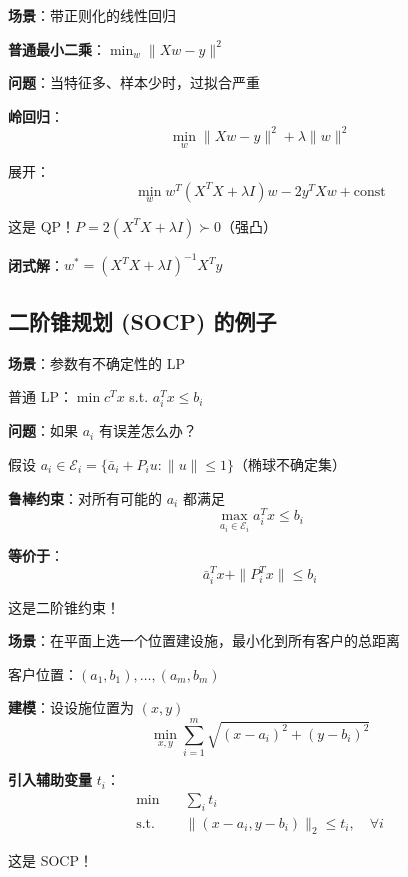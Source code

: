 \documentclass[12pt, a4paper]{ctexart}
\begin{document}
\begin{blackboard}[QP 例子 3：岭回归]

\textbf{场景}：带正则化的线性回归

\textbf{普通最小二乘}：$\min_w \|Xw - y\|^2$

\textbf{问题}：当特征多、样本少时，过拟合严重

\textbf{岭回归}：
\[
\min_w \|Xw - y\|^2 + \lambda \|w\|^2
\]

展开：
\[
\min_w w^T (X^T X + \lambda I) w - 2 y^T X w + \text{const}
\]

这是 QP！$P = 2(X^T X + \lambda I) \succ 0$（强凸）

\textbf{闭式解}：$w^* = (X^T X + \lambda I)^{-1} X^T y$

\end{blackboard}

\subsection{二阶锥规划 (SOCP) 的例子}

\begin{blackboard}

\textbf{场景}：参数有不确定性的 LP

普通 LP：$\min c^T x$ s.t. $a_i^T x \leq b_i$

\textbf{问题}：如果 $a_i$ 有误差怎么办？

假设 $a_i \in \mathcal{E}_i = \{\bar{a}_i + P_i u : \|u\| \leq 1\}$（椭球不确定集）

\textbf{鲁棒约束}：对所有可能的 $a_i$ 都满足
\[
\max_{a_i \in \mathcal{E}_i} a_i^T x \leq b_i
\]

\textbf{等价于}：
\[
\bar{a}_i^T x + \|P_i^T x\| \leq b_i
\]

这是二阶锥约束！

\end{blackboard}

\begin{blackboard}

\textbf{场景}：在平面上选一个位置建设施，最小化到所有客户的总距离

客户位置：$(a_1, b_1), \ldots, (a_m, b_m)$

\textbf{建模}：设设施位置为 $(x, y)$
\[
\min_{x, y} \sum_{i=1}^m \sqrt{(x - a_i)^2 + (y - b_i)^2}
\]

\textbf{引入辅助变量} $t_i$：
\[
\begin{aligned}
\min \quad & \sum_i t_i \\
\text{s.t.} \quad & \|(x - a_i, y - b_i)\|_2 \leq t_i, \quad \forall i
\end{aligned}
\]

这是 SOCP！

\end{blackboard}
\end{document}
